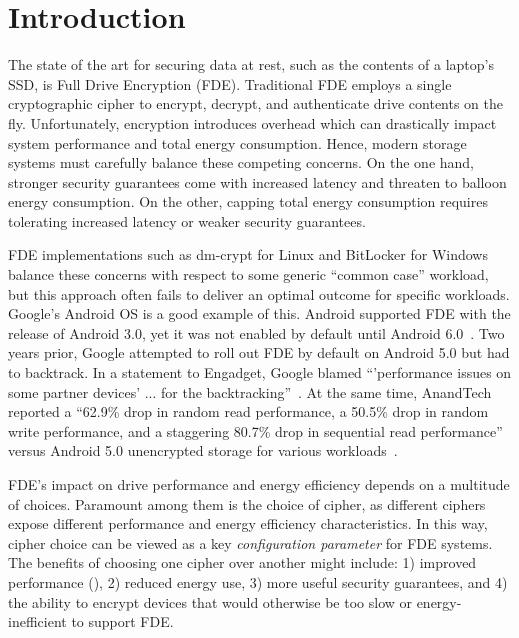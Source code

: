 \section{Introduction}\label{sec:introduction}

The state of the art for securing data at rest, such as the contents of a
laptop's SSD, is Full Drive Encryption (FDE). Traditional FDE employs a single
cryptographic cipher to encrypt, decrypt, and authenticate drive contents on the
fly. Unfortunately, encryption introduces overhead which can drastically impact
system performance and total energy consumption. Hence, modern storage systems
must carefully balance these competing concerns. On the one hand, stronger
security guarantees come with increased latency and threaten to balloon energy
consumption. On the other, capping total energy consumption requires tolerating
increased latency or weaker security guarantees.

FDE implementations such as dm-crypt for Linux and BitLocker for Windows balance
these concerns with respect to some generic ``common case'' workload, but
this approach often fails to deliver an optimal outcome for specific workloads.
Google's Android OS is a good example of this. Android supported FDE with the
release of Android 3.0, yet it was not enabled by default until Android
6.0~\cite{android-M-mobile-motivation}. Two years prior, Google attempted to
roll out FDE by default on Android 5.0 but had to backtrack. In a statement to
Engadget, Google blamed ``'performance issues on some partner devices' ... for
the backtracking''~\cite{google-engadget}. At the same time, AnandTech reported
a ``62.9\% drop in random read performance, a 50.5\% drop in random write
performance, and a staggering 80.7\% drop in sequential read performance''
versus Android 5.0 unencrypted storage for various
workloads~\cite{android-M-mobile-motivation-2}.

FDE's impact on drive performance and energy efficiency depends on a multitude
of choices. Paramount among them is the choice of cipher, as different ciphers
expose different performance and energy efficiency characteristics. In this way,
cipher choice can be viewed as a key \emph{configuration parameter} for FDE
systems. The benefits of choosing one cipher over another might include: 1)
improved performance (), 2) reduced energy
use, 3) more useful security guarantees, and 4) the ability to encrypt devices
that would otherwise be too slow or energy-inefficient to support FDE.

